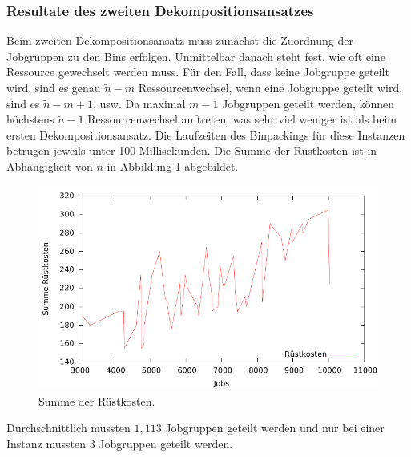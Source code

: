 \documentclass{scrreprt}
\begin{document}
\subsubsection{Resultate des zweiten Dekompositionsansatzes}
\label{subsubsec:ResultateDKA2}
Beim zweiten Dekompositionsansatz muss zunächst die Zuordnung der Jobgruppen zu den Bins erfolgen.
Unmittelbar danach steht fest, wie oft eine Ressource gewechselt werden muss. 
Für den Fall, dass keine Jobgruppe geteilt wird, sind es genau $\tilde{n}-m$ Ressourcenwechsel, wenn eine Jobgruppe geteilt wird, sind es $\tilde{n}-m+1$, usw.
Da maximal $m-1$ Jobgruppen geteilt werden, können höchstens $\tilde{n}-1$ Ressourcenwechsel auftreten, was sehr viel weniger ist als beim ersten Dekompositionsansatz.
Die Laufzeiten des Binpackings für diese Instanzen betrugen jeweils unter 100 Millisekunden.
Die Summe der Rüstkosten ist in Abhängigkeit von $n$ in Abbildung \ref{abb:kbplotsetupsn} abgebildet.
\begin{figure}
    \begin{center}
        \includegraphics[width=.8\textwidth]{../prog/binpacking/results/kbplotsetupsn.pdf}
    \end{center}
    \caption{
        \label{abb:kbplotsetupsn}
        Summe der Rüstkosten.
    }
\end{figure}
Durchschnittlich mussten $1{,}113$ Jobgruppen geteilt werden und nur bei einer Instanz mussten $3$ Jobgruppen geteilt werden.
\end{document}
